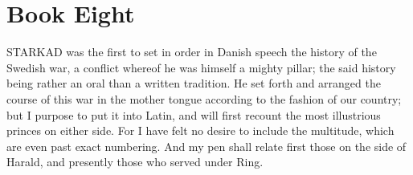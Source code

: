 \documentclass[10pt,a4paper]{report}
\begin{document}
\chapter{Book Eight}

STARKAD was the first to set in order in Danish speech the history of the Swedish war, a conflict whereof he was himself a mighty pillar; the said history being rather an oral than a written tradition. He set forth and arranged the course of this war in the mother tongue according to the fashion of our country; but I purpose to put it into Latin, and will first recount the most illustrious princes on either side. For I have felt no desire to include the multitude, which are even past exact numbering. And my pen shall relate first those on the side of Harald, and presently those who served under Ring.\\
\end{document}
